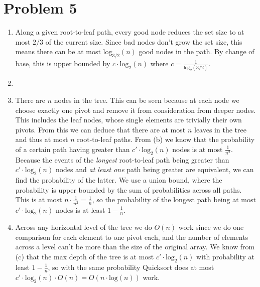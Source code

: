 \documentclass[11pt]{article}
\newcommand{\p}[1]{\left(#1\right)}
\renewcommand{\log}[1]{\text{log}\p{#1}}
\newcommand{\logb}[2]{\text{log}_{#1}\p{#2}}
\newcommand{\BigOh}[1]{O\p{#1}}
\newcommand{\asdf}{\newline\newline}
\begin{document}
\section*{Problem 5}
\begin{enumerate}[1.]
\item Along a given root-to-leaf path, every good node reduces the set size to at most $2/3$ of the current size. Since bad nodes don't grow the set size, this means there can be at most $\logb{3/2}{n}$ good nodes in the path. By change of base, this is upper bounded by $c\cdot\logb2n$ where $c=\frac1{\logb2{3/2}}$.
\item 
\item There are $n$ nodes in the tree. This can be seen because at each node we choose exactly one pivot and remove it from consideration from deeper nodes. This includes the leaf nodes, whose single elements are trivially their own pivots. From this we can deduce that there are at most $n$ leaves in the tree and thus at most $n$ root-to-leaf paths. From (b) we know that the probability of a certain path having greater than $c'\cdot\logb2n$ nodes is at most $\frac1{n^2}$.\asdf
Because the events of the \textit{longest} root-to-leaf path being greater than $c'\cdot\logb2n$ nodes and \textit{at least one} path being greater are equivalent, we can find the probability of the latter. We use a union bound, where the probability is upper bounded by the sum of probabilities across all paths. This is at most $n\cdot\frac1{n^2}=\frac1n$, so the probability of the longest path being at most $c'\cdot\logb2n$ nodes is at least $1-\frac1n$.
\item Across any horizontal level of the tree we do $\BigOh{n}$ work since we do one comparison for each element to one pivot each, and the number of elements across a level can't be more than the size of the original array. We know from (c) that the max depth of the tree is at most $c'\cdot\logb2n$ with probability at least $1-\frac1n$, so with the same probability Quicksort does at most $c'\cdot\logb2n\cdot\BigOh{n}=\BigOh{n\cdot\log n}$ work.
\end{enumerate}


\newpage
\end{document}
